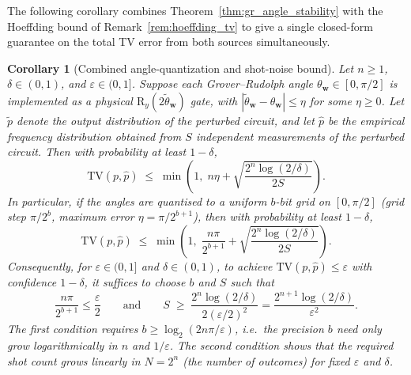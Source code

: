 \documentclass{article}
\newtheorem{corollary}[theorem]{Corollary}
\newcommand{\RY}{\mathrm{R}_y}
\numberwithin{equation}{section}
\begin{document}
The following corollary combines Theorem~\ref{thm:gr_angle_stability} with the
Hoeffding bound of Remark~\ref{rem:hoeffding_tv} to give a single closed-form
guarantee on the total TV error from both sources simultaneously.

\begin{corollary}[Combined angle-quantization and shot-noise bound]
\label{cor:combined_bound}
Let $n\ge 1$, $\delta\in(0,1)$, and $\varepsilon\in(0,1]$.
Suppose each Grover--Rudolph angle $\theta_{\mathbf{w}}\in[0,\pi/2]$ is implemented
as a physical $\RY(2\widetilde\theta_{\mathbf{w}})$ gate, with
$|\widetilde\theta_{\mathbf{w}}-\theta_{\mathbf{w}}|\le\eta$ for some $\eta\ge 0$.
Let $\widetilde p$ denote the output distribution of the perturbed circuit, and let
$\hat p$ be the empirical frequency distribution obtained from $S$ independent
measurements of the perturbed circuit.
Then with probability at least $1-\delta$,
\begin{equation}\label{eq:combined_bound}
\mathrm{TV}(p,\hat p)
\;\le\;
\min\!\left(1,\;
n\eta
+
\sqrt{\frac{2^n\log(2/\delta)}{2S}}\right).
\end{equation}
In particular, if the angles are quantised to a uniform $b$-bit grid on $[0,\pi/2]$
(grid step $\pi/2^b$, maximum error $\eta=\pi/2^{b+1}$), then with probability at least $1-\delta$,
\begin{equation}\label{eq:combined_bound_bits}
\mathrm{TV}(p,\hat p)
\;\le\;
\min\!\left(1,\;
\frac{n\pi}{2^{b+1}}
+
\sqrt{\frac{2^n\log(2/\delta)}{2S}}\right).
\end{equation}
Consequently, for $\varepsilon\in(0,1]$ and $\delta\in(0,1)$, to achieve $\mathrm{TV}(p,\hat p)\le\varepsilon$ with confidence $1-\delta$,
it suffices to choose $b$ and $S$ such that
\begin{equation}\label{eq:design_rule}
\frac{n\pi}{2^{b+1}}\le\frac{\varepsilon}{2}
\qquad\text{and}\qquad
S\;\ge\;\frac{2^n\log(2/\delta)}{2(\varepsilon/2)^2}
=
\frac{2^{n+1}\log(2/\delta)}{\varepsilon^2}.
\end{equation}
The first condition requires $b\ge\log_2(2n\pi/\varepsilon)$, i.e.\ the precision
$b$ need only grow \emph{logarithmically} in $n$ and $1/\varepsilon$.
The second condition shows that the required shot count grows \emph{linearly}
in $N=2^n$ (the number of outcomes) for fixed $\varepsilon$ and $\delta$.
\end{corollary}
\end{document}
